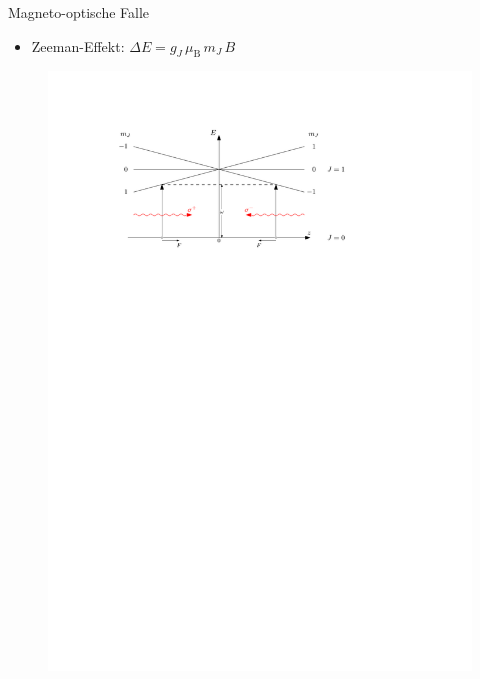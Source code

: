 \documentclass[12pt,xcolor=dvipsnames]{beamer}
\begin{document}
\begin{frame}{Magneto-optische Falle}
\begin{itemize}
	\item Zeeman-Effekt: $\Delta E = g_J \, \mu_\mathrm{B} \, m_J \, B$
\end{itemize}

\vspace{0.5cm}

\begin{figure}[h]
	\centering
	\includegraphics[width=1\textwidth]{./figures/mot.pdf}
\end{figure}
\end{frame}
\end{document}
